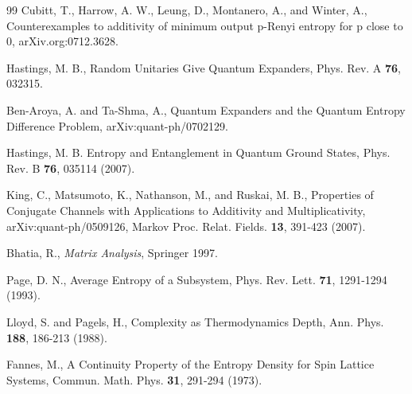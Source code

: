 \documentclass[aps,prl,amsmath,amssymb,amsfonts,superscriptaddress,floatfix]{revtex4}
\begin{document}
\begin{thebibliography}{99}
 Cubitt, T., Harrow, A. W., Leung, D., Montanero, A., and Winter, A., Counterexamples to additivity of minimum output p-Renyi entropy for
p close to 0,
arXiv.org:0712.3628.

 Hastings, M. B., Random Unitaries Give Quantum
Expanders, Phys. Rev. A {\bf 76}, 032315.

 Ben-Aroya, A. and Ta-Shma, A., Quantum Expanders and
the Quantum Entropy Difference Problem, arXiv:quant-ph/0702129.

 Hastings, M. B. Entropy and Entanglement in Quantum Ground
States, Phys. Rev. B {\bf 76}, 035114 (2007).

 King, C., Matsumoto, K., Nathanson, M., and Ruskai, M. B.,
Properties of Conjugate Channels with Applications to Additivity and
Multiplicativity,
arXiv:quant-ph/0509126, Markov Proc. Relat. Fields. {\bf 13}, 391-423 (2007).

  Bhatia, R., {\it Matrix Analysis}, Springer 1997.

 Page, D. N., Average Entropy of a Subsystem,
Phys. Rev. Lett. {\bf 71}, 1291-1294 (1993).

 Lloyd, S. and Pagels, H., Complexity as Thermodynamics
Depth, Ann. Phys. {\bf 188}, 186-213 (1988).

 Fannes, M., A Continuity Property of the Entropy Density
for Spin Lattice Systems, Commun. Math. Phys. {\bf 31}, 291-294 (1973).
\end{thebibliography}
\end{document}
